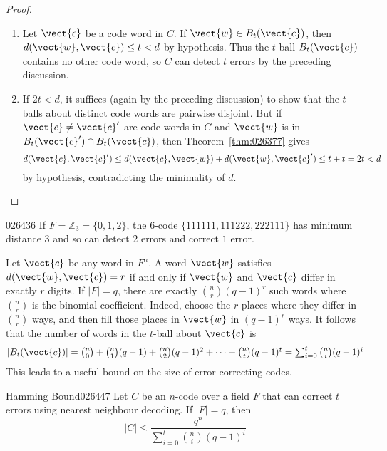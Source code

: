\begin{proof}
\vspace{-1em}
\begin{enumerate}
\item Let $\vect{c}$ be a code word in $C$. If $\vect{w} \in B_{t}(\vect{c})$, then $d(\vect{w}, \vect{c}) \leq t < d$ by hypothesis. Thus the $t$-ball $B_{t}(\vect{c})$ contains no other code word, so $C$ can detect $t$ errors by the preceding discussion.

\item If $2t < d$, it suffices (again by the preceding discussion) to show that the $t$-balls about distinct code words are pairwise disjoint. But if $\vect{c} \neq \vect{c}^{\prime}$ are code words in $C$ and $\vect{w}$ is in $B_{t}(\vect{c}^{\prime}) \cap B_{t}(\vect{c})$, then Theorem~\ref{thm:026377} gives
\begin{equation*}
d(\vect{c}, \vect{c}^\prime) \le d(\vect{c}, \vect{w}) + d(\vect{w}, \vect{c}^\prime) \le t + t = 2t < d
\end{equation*}
by hypothesis, contradicting the minimality of $d$.
\end{enumerate}
\vspace*{-2em}\end{proof}

\begin{example}{}{026436}
If $F = \mathbb{Z}_3 = \{0, 1, 2\}$, the 6-code $\{111111, 111222, 222111\}$ has minimum distance $3$ and so can detect $2$ errors and correct $1$ error.
\end{example}

Let $\vect{c}$ be any word in $F^{n}$. A word $\vect{w}$ satisfies $d(\vect{w}, \vect{c}) = r$ if and only if $\vect{w}$ and $\vect{c}$ differ in exactly $r$ digits. If $|F| = q$, there are exactly $\binom{n}{r}(q - 1)^r$ such words where $\binom{n}{r}$ is the binomial coefficient. Indeed, choose the $r$ places where they differ in $\binom{n}{r}$ ways, and then fill those places in $\vect{w}$ in $(q - 1)^{r}$ ways. It follows that the number of words in the $t$-ball about $\vect{c}$ is
\begin{equation*}
|B_{t}(\vect{c})| = \textstyle \binom{n}{0} + \binom{n}{1}(q - 1) + \binom{n}{2}(q - 1)^2 + \dots + \binom{n}{t}(q - 1)^t = \sum_{i = 0}^{t} \binom{n}{i}(q - 1)^i
\end{equation*}
This leads to a useful bound on the size of error-correcting codes.

\begin{theorem}{Hamming Bound}{026447}
Let $C$ be an $n$-code over a field $F$ that can correct $t$ errors using nearest neighbour decoding. If $|F| = q$, then
\begin{equation*}
|C| \le \frac{q^n}{\sum_{i = 0}^{t} \binom{n}{i}(q - 1)^i}
\end{equation*}
\end{theorem}

